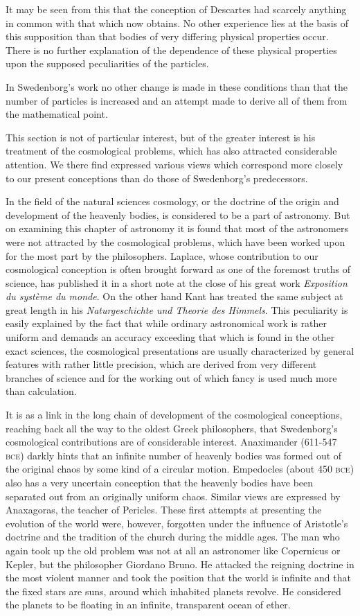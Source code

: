 \documentclass[a4paper, 11pt, oneside, polutonikogreek, english]{article}
\begin{document}
It may be seen from this that the conception of Descartes had scarcely anything in common with that which now obtains. No other experience lies at the basis of this supposition than that bodies of very differing physical properties occur. There is no further explanation of the dependence of these physical properties upon the supposed peculiarities of the particles.

In Swedenborg's work no other change is made in these conditions than that the number of particles is increased and an attempt made to derive all of them from the mathematical point.

This section is not of particular interest, but of the greater interest is his treatment of the cosmological problems, which has also attracted considerable attention. We there find expressed various views which correspond more closely to our present conceptions than do those of Swedenborg's predecessors.

In the field of the natural sciences cosmology, or the doctrine of the origin and development of the heavenly bodies, is considered to be a part of astronomy. But on examining this chapter of astronomy it is found that most of the astronomers were not attracted by the cosmological problems, which have been worked upon for the most part by the philosophers. Laplace, whose contribution to our cosmological conception is often brought forward as one of the foremost truths of science, has published it in a short note at the close of his great work \emph{Exposition du système du monde}. On the other hand Kant has treated the same subject at great length in his \emph{Naturgeschichte und Theorie des Himmels}. This peculiarity is easily explained by the fact that while ordinary astronomical work is rather uniform and demands an accuracy exceeding that which is found in the other exact sciences, the cosmological presentations are usually characterized by general features with rather little precision, which are derived from very different branches of science and for the working out of which fancy is used much more than calculation.

It is as a link in the long chain of development of the cosmological conceptions, reaching back all the way to the oldest Greek philosophers, that Swedenborg's cosmological contributions are of considerable interest. Anaximander (611-547 \textsc{bce}) darkly hints that an infinite number of heavenly bodies was formed out of the original chaos by some kind of a circular motion. Empedocles (about 450 \textsc{bce}) also has a very uncertain conception that the heavenly bodies have been separated out from an originally uniform chaos. Similar views are expressed by Anaxagoras, the teacher of Pericles. These first attempts at presenting the evolution of the world were, however, forgotten under the influence of Aristotle's doctrine and the tradition of the church during the middle ages. The man who again took up the old problem was not at all an astronomer like Copernicus or Kepler, but the philosopher Giordano Bruno. He attacked the reigning doctrine in the most violent manner and took the position that the world is infinite and that the fixed stars are suns, around which inhabited planets revolve. He considered the planets to be floating in an infinite, transparent ocean of ether.
\end{document}
